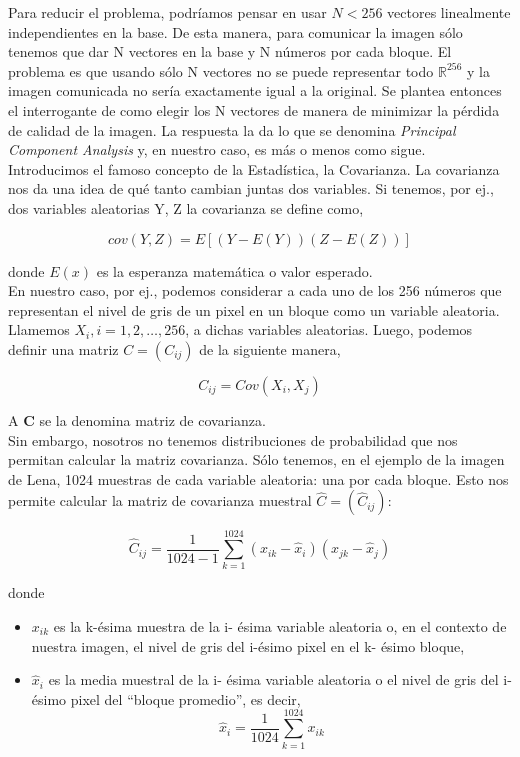 \documentclass[twocolumn,a4paper,10pt]{article}
\begin{document}
Para reducir el problema, podríamos pensar en usar $N < 256$ vectores linealmente independientes en la base. De esta manera, para comunicar la imagen s\'olo
tenemos que dar N vectores en la base y N n\'umeros por cada bloque. El problema es que usando s\'olo N vectores no se puede representar todo $\mathbb{R}^{256}$ y la 
imagen comunicada no ser\'ia exactamente igual a la original. Se plantea entonces el interrogante de como elegir los N vectores de manera de minimizar la p\'erdida 
de calidad de la imagen. La respuesta la da lo que se denomina \textit{Principal Component Analysis} y, en nuestro caso, es m\'as o menos como sigue.\\

Introducimos el famoso concepto de la Estadística, la Covarianza. La covarianza nos da una idea de qu\'e tanto cambian juntas dos variables. Si tenemos, por ej., 
dos variables aleatorias Y, Z la covarianza se define como,

\[ cov(Y, Z) = E [(Y - E(Y )) (Z - E(Z))] \]

donde $E(x)$ es la esperanza matem\'atica o valor esperado. \\

En nuestro caso, por ej., podemos considerar a cada uno de los 256 n\'umeros que representan el nivel de gris de un pixel en un bloque como un variable aleatoria.
Llamemos $X_{i}, i = 1, 2, \dotsc, 256$, a dichas variables aleatorias. Luego, podemos definir una matriz $C = (C_{ij} )$ de la siguiente manera,

\[C_{ij} = Cov(X_{i}, X_{j})  \]

A $\textbf{C}$ se la denomina matriz de covarianza.\\

Sin embargo, nosotros no tenemos distribuciones de probabilidad que nos permitan calcular la matriz covarianza. S\'olo tenemos, en el ejemplo de la imagen
de Lena, 1024 muestras de cada variable aleatoria: una por cada bloque. Esto nos permite calcular la matriz de covarianza muestral $\widehat{C} = (\widehat{C}_{ij})$:

\[ \widehat{C}_{ij} =  \frac{1}{1024 - 1}\sum_{k=1}^{1024} (x_{ik} - \widehat{x}_{i}) (x_{jk} - \widehat{x}_{j}) \]

donde
\begin{itemize}
    \item $x_{ik}$ es la k-\'esima muestra de la i- \'esima variable aleatoria o, en el contexto de nuestra imagen, el nivel de gris del i-\'esimo pixel en el 
    k- \'esimo bloque,
    \item $\widehat{x}_{i}$ es la media muestral de la i- \'esima variable aleatoria o el nivel de gris del i-\'esimo pixel del “bloque promedio”, es decir,
    \[ \widehat{x}_{i} = \frac{1}{1024} \sum_{k=1}^{1024} x_{ik} \]
\end{itemize}
\end{document}
